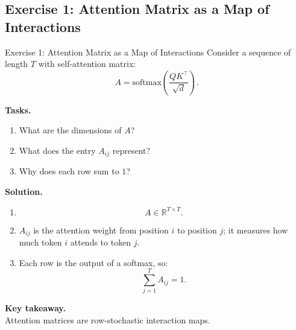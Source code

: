 \documentclass[aspectratio=169,11pt]{beamer}
\begin{document}
\subsection{Exercise 1: Attention Matrix as a Map of Interactions}
\begin{frame}[t,allowframebreaks]{Exercise 1: Attention Matrix as a Map of Interactions}
\small
Consider a sequence of length $T$ with self-attention matrix:
\[
A = \text{softmax}\left(\frac{QK^\top}{\sqrt{d}}\right).
\]

\textbf{Tasks.}\\ \begin{enumerate}
    \item What are the dimensions of $A$?
    \item What does the entry $A_{ij}$ represent?
    \item Why does each row sum to $1$?
\end{enumerate}

\textbf{Solution.}\\ \begin{enumerate}
    \item
    \[
    A \in \mathbb{R}^{T \times T}.
    \]

    \item $A_{ij}$ is the attention weight from position $i$ to position $j$; it measures how much token $i$ attends to token $j$.

    \item Each row is the output of a softmax, so:
    \[
    \sum_{j=1}^T A_{ij} = 1.
    \]
\end{enumerate}

\textbf{Key takeaway.}\\ Attention matrices are row-stochastic interaction maps.
\end{frame}
\end{document}
